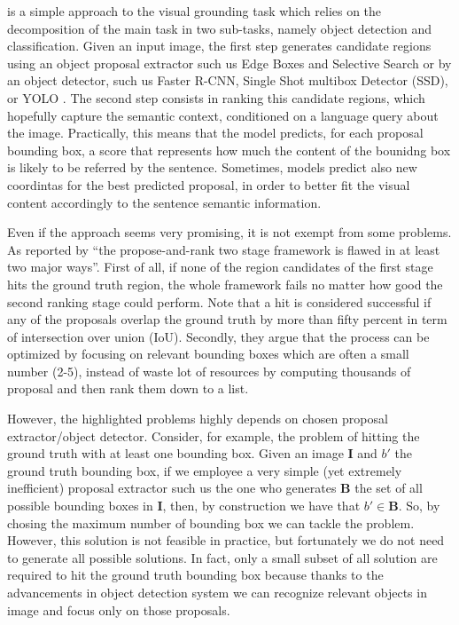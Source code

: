  is a simple approach to the visual
grounding task which relies on the decomposition of the main task in
two sub-tasks, namely object detection and classification. Given an
input image, the first step generates candidate regions using an
object proposal extractor such us Edge Boxes and Selective Search
 or by an object detector, such
us Faster R-CNN, Single Shot multibox Detector (SSD), or YOLO
. The second step consists in
ranking this candidate regions, which hopefully capture the semantic
context, conditioned on a language query about the image. Practically,
this means that the model predicts, for each proposal bounding box, a
score that represents how much the content of the bounidng box is
likely to be referred by the sentence. Sometimes, models predict also
new coordintas for the best predicted proposal, in order to better fit
the visual content accordingly to the sentence semantic information.

Even if the approach seems very promising, it is not exempt from some
problems. As reported by  ``the
propose-and-rank two stage framework is flawed in at least two major
ways''. First of all, if none of the region candidates of the first
stage hits the ground truth region, the whole framework fails no
matter how good the second ranking stage could perform. Note that a
hit is considered successful if any of the proposals overlap the
ground truth by more than fifty percent in term of intersection over
union (IoU). Secondly, they argue that the process can be optimized by
focusing on relevant bounding boxes which are often a small number
(2-5), instead of waste lot of resources by computing thousands of
proposal and then rank them down to a list.

However, the highlighted problems highly depends on chosen
proposal extractor/object detector. Consider, for example, the problem
of hitting the ground truth with at least one bounding box. Given an
image $\bm{I}$ and $b'$ the ground truth bounding box, if we employee
a very simple (yet extremely inefficient) proposal extractor such us
the one who generates $\bm{B}$ the set of all possible bounding boxes
in $\bm{I}$, then, by construction we have that $b' \in \bm{B}$. So,
by chosing the maximum number of bounding box we can tackle the
problem. However, this solution is not feasible in practice, but
fortunately we do not need to generate all possible solutions. In
fact, only a small subset of all solution are required to hit the
ground truth bounding box because thanks to the advancements in object
detection system we can recognize relevant objects in image and focus
only on those proposals.

